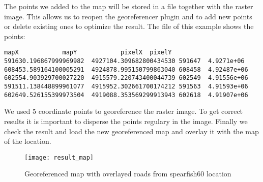 The points we added to the map will be stored in a  file together with the raster image.
This allows us to reopen the georeferencer plugin and to add new points or delete existing ones to optimize the result.
The  file of this example shows the points:

\begin{verbatim}
mapX    		mapY    		pixelX  pixelY
591630.196867999969982  4927104.309682800434530 591647  4.9271e+06
608453.589164100005291  4924878.995150799863040 608458  4.92487e+06
602554.903929700027220  4915579.220743400044739 602549  4.91556e+06
591511.138448899961077  4915952.302661700174212 591563  4.91593e+06
602649.526155399973504  4919088.353569299913943 602618  4.91907e+06
\end{verbatim} 

We used 5 coordinate points to georeference the raster image.
To get correct results it is important to disperse the points regulary in the image.
Finally we check the result and load the new georeferenced map  and overlay it with the map  of the  location.

\begin{figure}[ht]
\begin{center}
  \caption{Georeferenced map with overlayed roads from spearfish60 location
  \nixcaption}\label{fig:result_map}\smallskip
  \texttt{[image: result\_map]}
\end{center}
\end{figure}
